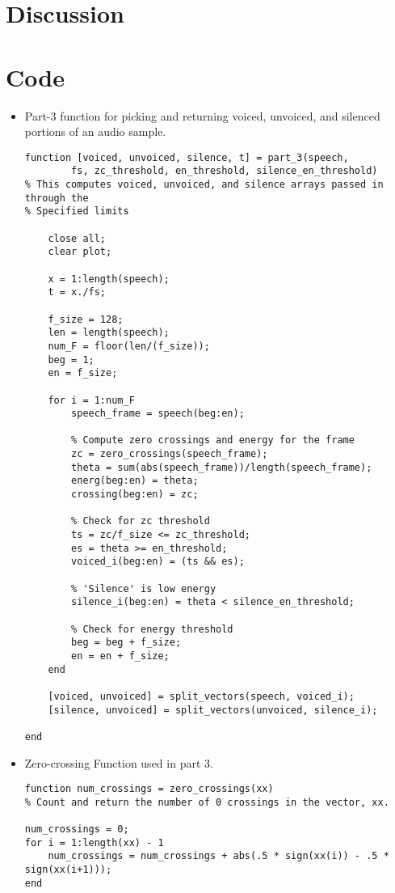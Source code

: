 \documentclass[11pt]{article}
\begin{document}
\section{Discussion}



\section{Code}

\begin{itemize}

\item Part-3 function for picking and returning voiced, unvoiced, and silenced portions of an audio sample.

\begin{lstlisting}
function [voiced, unvoiced, silence, t] = part_3(speech, 
		fs, zc_threshold, en_threshold, silence_en_threshold)
% This computes voiced, unvoiced, and silence arrays passed in through the
% Specified limits

    close all;
    clear plot;

    x = 1:length(speech);
    t = x./fs;

    f_size = 128;
    len = length(speech);
    num_F = floor(len/(f_size));
    beg = 1;
    en = f_size;

    for i = 1:num_F
        speech_frame = speech(beg:en);

        % Compute zero crossings and energy for the frame
        zc = zero_crossings(speech_frame);
        theta = sum(abs(speech_frame))/length(speech_frame);
        energ(beg:en) = theta;
        crossing(beg:en) = zc;

        % Check for zc threshold
        ts = zc/f_size <= zc_threshold;
        es = theta >= en_threshold;
        voiced_i(beg:en) = (ts && es);

        % 'Silence' is low energy
        silence_i(beg:en) = theta < silence_en_threshold;

        % Check for energy threshold
        beg = beg + f_size;
        en = en + f_size;
    end

    [voiced, unvoiced] = split_vectors(speech, voiced_i); 
    [silence, unvoiced] = split_vectors(unvoiced, silence_i);

end
\end{lstlisting}


\item Zero-crossing Function used in part 3.
\begin{lstlisting}
function num_crossings = zero_crossings(xx)
% Count and return the number of 0 crossings in the vector, xx.

num_crossings = 0;
for i = 1:length(xx) - 1
    num_crossings = num_crossings + abs(.5 * sign(xx(i)) - .5 * sign(xx(i+1)));
end
\end{lstlisting}

\end{itemize}
\end{document}
